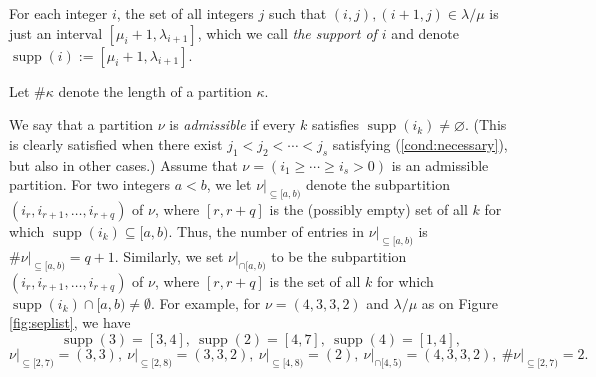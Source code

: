 \documentclass[numbers=enddot,12pt,final,onecolumn,notitlepage]{scrartcl}%
\theoremstyle{definition}
\def\seplistvar{{{\nu}}} %
\def\supp{{\operatorname{supp}}}
\def\lm{{\lambda/\mu}}
\begin{document}
\begin{comment}
 
\footnote{By this, we mean that $\lm$ has at least one
cell, and cannot be represented
as a disjoint union of two nonempty skew partitions $\alpha/\beta$
and $\gamma/\delta$ such that no cell of $\alpha/\beta$ is adjacent
to any cell of $\gamma/\delta$. This is a harmless assumption,
since every skew partition $\lm$ can be written as a disjoint union
of such connected skew partitions, and these ``connected
components'' do not interact when it comes to studying rpps:
Choosing a 12-rpp of shape $\lm$ is tantamount to choosing
a 12-rpp for each of these components; and choosing a 12-rpp of
shape $\lm$ with seplist-partition equal to a given partition
$\seplistvar$ is tantamount to choosing a 12-rpp for each of the
components with seplist-partition equal to the ``appropriate piece''
of $\seplistvar$. (What an ``appropriate piece'' is should be
clear enough, since two distinct connected components are supported
on different rows.)}.

\end{comment}

\newcommand{\nuxy}[2]{\seplistvar\big|_{\subseteq[#1,#2)}}
\newcommand{\nuxycap}[2]{\seplistvar\big|_{\cap[#1,#2)}}
\newcommand{\nupxy}[2]{\seplistvar^{\prime}\big|_{\subseteq[#1,#2)}}

\def\nuab{\nuxy{a}{b}}
\def\nuabcap{\nuxycap{a}{b}}



For each integer $i$, the set of all integers $j$ such that $(i,j),(i+1,j)\in\lm$ is just an interval $[\mu_{i}+1,\lambda_{i+1}]$, which we call \textit{the support of $i$} and denote $\supp(i):=[\mu_{i}+1,\lambda_{i+1}]$.

Let $\#\kappa$ denote the length of a partition $\kappa$.

We say that a partition $\seplistvar$ is \textit{admissible} if
every $k$ satisfies $\supp(i_k) \neq \varnothing$. (This is
clearly satisfied when there exist $j_1<j_2<\cdots<j_s$
satisfying (\ref{cond:necessary}), but also in other cases.)
Assume that $\seplistvar = \left(i_1 \geq \cdots \geq i_s > 0\right)$ is an admissible partition.
For two integers $a< b$, we let $\nuab$ denote the subpartition $(i_r,i_{r+1},\dots,i_{r+q})$ of $\seplistvar$, where $[r, r+q]$ is the (possibly empty) set of all $k$ for which $\supp(i_k)\subseteq [a,b)$. Thus, the number of entries in $\nuab$ is $\#\nuab =q+1$. Similarly, we set $\nuabcap$ to be the subpartition $(i_r,i_{r+1},\dots,i_{r+q})$ of $\seplistvar$, where $[r, r+q]$ is the set of all $k$ for which $\supp(i_k)\cap [a,b)\neq\emptyset$.
For example, for $\seplistvar=(4,3,3,2)$ and $\lm$ as on Figure \ref{fig:seplist}, we have 
$$\supp(3)=[3,4],\ \supp(2)=[4,7],\ \supp(4)=[1,4],$$ 
$$\nuxy{2}{7}=(3,3),\ \nuxy{2}{8}=(3,3,2),\ \nuxy{4}{8}=(2),\ \nuxycap{4}{5}=(4,3,3,2),\ \#\nuxy{2}{7}=2.$$
\end{document}
